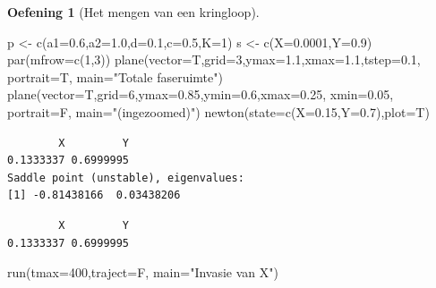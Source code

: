\documentclass[
  a4paper,
]{scrbook}
\newenvironment{Shaded}{\begin{snugshade}}{\end{snugshade}}
\newcommand{\AttributeTok}[1]{\textcolor[rgb]{0.40,0.45,0.13}{#1}}
\newcommand{\DecValTok}[1]{\textcolor[rgb]{0.68,0.00,0.00}{#1}}
\newcommand{\FloatTok}[1]{\textcolor[rgb]{0.68,0.00,0.00}{#1}}
\newcommand{\FunctionTok}[1]{\textcolor[rgb]{0.28,0.35,0.67}{#1}}
\newcommand{\NormalTok}[1]{\textcolor[rgb]{0.00,0.23,0.31}{#1}}
\newcommand{\OtherTok}[1]{\textcolor[rgb]{0.00,0.23,0.31}{#1}}
\newcommand{\StringTok}[1]{\textcolor[rgb]{0.13,0.47,0.30}{#1}}
\theoremstyle{definition}
\newtheorem{exercise}{Oefening}[chapter]
\theoremstyle{remark}
\begin{document}
\begin{exercise}[Het mengen van een
kringloop]
\begin{tcolorbox}
\begin{Shaded}
\begin{Highlighting}[]
\NormalTok{p }\OtherTok{\textless{}{-}} \FunctionTok{c}\NormalTok{(}\AttributeTok{a1=}\FloatTok{0.6}\NormalTok{,}\AttributeTok{a2=}\FloatTok{1.0}\NormalTok{,}\AttributeTok{d=}\FloatTok{0.1}\NormalTok{,}\AttributeTok{c=}\FloatTok{0.5}\NormalTok{,}\AttributeTok{K=}\DecValTok{1}\NormalTok{)}
\NormalTok{s }\OtherTok{\textless{}{-}} \FunctionTok{c}\NormalTok{(}\AttributeTok{X=}\FloatTok{0.0001}\NormalTok{,}\AttributeTok{Y=}\FloatTok{0.9}\NormalTok{)}
\FunctionTok{par}\NormalTok{(}\AttributeTok{mfrow=}\FunctionTok{c}\NormalTok{(}\DecValTok{1}\NormalTok{,}\DecValTok{3}\NormalTok{))}
\FunctionTok{plane}\NormalTok{(}\AttributeTok{vector=}\NormalTok{T,}\AttributeTok{grid=}\DecValTok{3}\NormalTok{,}\AttributeTok{ymax=}\FloatTok{1.1}\NormalTok{,}\AttributeTok{xmax=}\FloatTok{1.1}\NormalTok{,}\AttributeTok{tstep=}\FloatTok{0.1}\NormalTok{, }\AttributeTok{portrait=}\NormalTok{T, }\AttributeTok{main=}\StringTok{"Totale faseruimte"}\NormalTok{)}
\FunctionTok{plane}\NormalTok{(}\AttributeTok{vector=}\NormalTok{T,}\AttributeTok{grid=}\DecValTok{6}\NormalTok{,}\AttributeTok{ymax=}\FloatTok{0.85}\NormalTok{,}\AttributeTok{ymin=}\FloatTok{0.6}\NormalTok{,}\AttributeTok{xmax=}\FloatTok{0.25}\NormalTok{, }\AttributeTok{xmin=}\FloatTok{0.05}\NormalTok{, }\AttributeTok{portrait=}\NormalTok{F, }\AttributeTok{main=}\StringTok{"(ingezoomed)"}\NormalTok{)}
\FunctionTok{newton}\NormalTok{(}\AttributeTok{state=}\FunctionTok{c}\NormalTok{(}\AttributeTok{X=}\FloatTok{0.15}\NormalTok{,}\AttributeTok{Y=}\FloatTok{0.7}\NormalTok{),}\AttributeTok{plot=}\NormalTok{T)}
\end{Highlighting}
\end{Shaded}

\begin{verbatim}
        X         Y 
0.1333337 0.6999995 
Saddle point (unstable), eigenvalues:
[1] -0.81438166  0.03438206
\end{verbatim}

\begin{verbatim}
        X         Y 
0.1333337 0.6999995 
\end{verbatim}

\begin{Shaded}
\begin{Highlighting}[]
\FunctionTok{run}\NormalTok{(}\AttributeTok{tmax=}\DecValTok{400}\NormalTok{,}\AttributeTok{traject=}\NormalTok{F, }\AttributeTok{main=}\StringTok{"Invasie van X"}\NormalTok{)}
\end{Highlighting}
\end{Shaded}


\end{tcolorbox}
\end{exercise}
\end{document}
